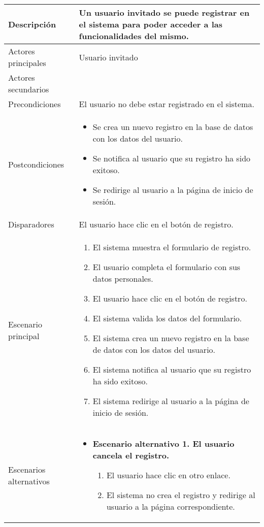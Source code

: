 \begin{longtable}{
    >{\columncolor{lightgreen!20}}p{4cm}
    p{12cm}
    }
    \midrule
    Descripción & Un usuario invitado se puede registrar en el sistema para poder acceder a las funcionalidades del mismo. \\
    \midrule
    Actores principales & Usuario invitado \\
    \midrule
    Actores secundarios &  \\
    \midrule
    Precondiciones & El usuario no debe estar registrado en el sistema. \\
    \midrule
    Postcondiciones & \begin{itemize}[nosep,leftmargin=*]
      \item Se crea un nuevo registro en la base de datos con los datos del usuario.
      \item Se notifica al usuario que su registro ha sido exitoso.
      \item Se redirige al usuario a la página de inicio de sesión.
    \end{itemize} \\
    \midrule
    Disparadores & El usuario hace clic en el botón de registro. \\
    \midrule
    Escenario principal & \begin{enumerate}[nosep,leftmargin=*]
      \item El sistema muestra el formulario de registro.
      \item El usuario completa el formulario con sus datos personales.
      \item El usuario hace clic en el botón de registro.
      \item El sistema valida los datos del formulario.
      \item El sistema crea un nuevo registro en la base de datos con los datos del usuario.
      \item El sistema notifica al usuario que su registro ha sido exitoso.
      \item El sistema redirige al usuario a la página de inicio de sesión.
    \end{enumerate} \\
    \midrule
    Escenarios alternativos & 
    \begin{itemize}[nosep,leftmargin=*]
      \item \textbf{Escenario alternativo 1. El usuario cancela el registro.}
      \begin{enumerate}[nosep,leftmargin=*]
          \item El usuario hace clic en otro enlace.
          \item El sistema no crea el registro y redirige al usuario a la página correspondiente.

\end{enumerate}
\end{itemize}
\end{longtable}
